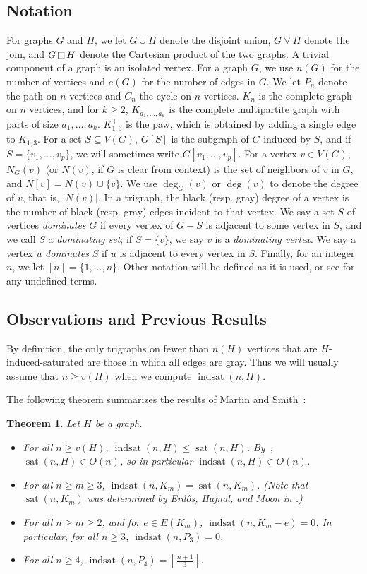 \documentclass[12pt]{amsart}
\theoremstyle{plain}
\newtheorem{thm}{Theorem}[section]
\theoremstyle{definition}
\theoremstyle{remark}
\newcommand{\indsat}[2]{\ensuremath{\operatorname{indsat}(#1,#2)}\xspace}
\newcommand{\sat}[2]{\ensuremath{\operatorname{sat}(#1,#2)}\xspace}
\newcommand{\paw}{\ensuremath{K_{1,3}^+}\xspace}
\newcommand{\cartprod}{\mathop{\scriptsize\Box}}
\begin{document}
\subsection{Notation} For graphs $G$ and $H$, we let $G \cup H$ denote the disjoint union, $G \vee H$ denote the join, and $G \cartprod H$ denote the Cartesian product of the two graphs.
A trivial component of a graph is an isolated vertex.
For a graph $G$, we use $n(G)$ for the number of vertices and $e(G)$ for the number of edges in $G$.
We let $P_n$ denote the path on $n$ vertices and $C_n$ the cycle on $n$ vertices. $K_n$ is the complete graph on $n$ vertices, and for $k \geq 2$, $K_{a_1,\ldots,a_k}$ is the complete multipartite graph with parts of size $a_1,\ldots,a_k$.  $\paw$ is the paw, which is obtained by adding a single edge to $K_{1,3}$.  For a set $S \subseteq V(G)$, $G[S]$ is the subgraph of $G$ induced by $S$, and if $S=\{v_1, \ldots, v_p\}$, we will sometimes write $G[v_1, \ldots, v_p]$.
For a vertex $v\in V(G)$, $N_G(v)$ (or $N(v)$, if $G$ is clear from context) is the set of neighbors of $v$ in $G$, and $N[v]=N(v) \cup \{v\}$. We use $\deg_G(v)$ or $\deg(v)$ to denote the degree of $v$, that is, $|N(v)|$.
In a trigraph, the black (resp. gray) degree of a vertex is the number of black (resp. gray) edges incident to that vertex.
We say a set $S$ of vertices \emph{dominates} $G$ if every vertex of $G-S$ is adjacent to some vertex in $S$, and we call $S$ a {\em dominating set}; if $S=\{v\}$, we say $v$ is a \emph{dominating vertex}.
We say a vertex $u$ \emph{dominates} $S$ if $u$ is adjacent to every vertex in $S$.
Finally, for an integer $n$, we let $[n]=\{1,\ldots, n\}$.
Other notation will be defined as it is used, or see \cite{West} for any undefined terms.

\subsection{Observations and Previous Results}

By definition, the only trigraphs on fewer than $n(H)$ vertices that are $H$-induced-saturated are those in which all edges are gray. Thus we will usually assume that $n \ge v(H)$ when we compute $\indsat{n}{H}$.

The following theorem summarizes the results of Martin and Smith~\cite{MS}:
\begin{thm}\label{thm:sat}
Let $H$ be a graph.
\begin{itemize}
\item For all $n\geq v(H)$, $\indsat{n}{H}\leq\sat{n}{H}$. By~\cite{KT}, $\sat{n}{H} \in O(n)$, so in particular $\indsat{n}{H}\in O(n)$.
\item  For all $n\geq m\geq3$, $\indsat{n}{K_m}=\sat{n}{K_m}$. (Note that $\sat{n}{K_m}$ was determined by Erd\H{o}s, Hajnal, and Moon in \cite{EHM}.)
\item For all $n\geq m\ge 2$, and for $e \in E(K_m)$, $\indsat{n}{K_m-e}=0$. In particular, for all $n\geq3$, $\indsat{n}{P_3}=0$.
\item For all $n\geq4$, $\indsat{n}{P_4}=\left\lceil\frac{n+1}{3}\right\rceil$.
\end{itemize}
\end{thm}
\end{document}
